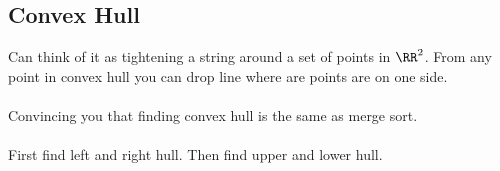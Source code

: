 \documentclass[class=scrartcl, crop=false]{standalone}
\begin{document}
\subsection{Convex Hull}

Can think of it as tightening a string around a set of points in $\RR^2$. From any point in convex hull you can drop line where are points are on one side.
\\\\
Convincing you that finding convex hull is the same as merge sort.
\\\\
First find left and right hull. Then find upper and lower hull.
\end{document}
